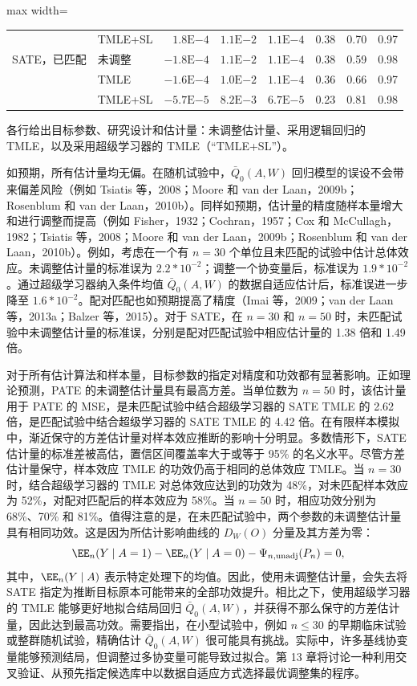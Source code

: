 \begin{table}[htbp]
\begin{adjustbox}{max width=\textwidth}
\begin{tabular}{@{}llrrrrrr@{}}
 & TMLE+SL & $1.8\mathrm E{-4}$ & $1.1\mathrm E{-2}$ & $1.1\mathrm E{-4}$ & 0.38 & 0.70 & 0.97 \\
SATE，已匹配 & 未调整 & $-1.8\mathrm E{-4}$ & $1.1\mathrm E{-2}$ & $1.1\mathrm E{-4}$ & 0.38 & 0.59 & 0.98 \\
 & TMLE & $-1.6\mathrm E{-4}$ & $1.0\mathrm E{-2}$ & $1.1\mathrm E{-4}$ & 0.36 & 0.66 & 0.97 \\
 & TMLE+SL & $-5.7\mathrm E{-5}$ & $8.2\mathrm E{-3}$ & $6.7\mathrm E{-5}$ & 0.23 & 0.81 & 0.98 \\
\bottomrule
\end{tabular}
\end{adjustbox}
\par\smallskip
\begin{minipage}{\textwidth}
各行给出目标参数、研究设计和估计量：未调整估计量、采用逻辑回归的 TMLE，以及采用超级学习器的 TMLE（“TMLE+SL”）。
\end{minipage}
\endgroup
\end{table}

如预期，所有估计量均无偏。在随机试验中，$\bar Q_0(A,W)$ 回归模型的误设不会带来偏差风险（例如 Tsiatis 等，2008；Moore 和 van der Laan，2009b；Rosenblum 和 van der Laan，2010b）。同样如预期，估计量的精度随样本量增大和进行调整而提高（例如 Fisher，1932；Cochran，1957；Cox 和 McCullagh，1982；Tsiatis 等，2008；Moore 和 van der Laan，2009b；Rosenblum 和 van der Laan，2010b）。例如，考虑在一个有 $n=30$ 个单位且未匹配的试验中估计总体效应。未调整估计量的标准误为 $2.2*10^{-2}$；调整一个协变量后，标准误为 $1.9*10^{-2}$。通过超级学习器纳入条件均值 $\bar Q_0(A,W)$ 的数据自适应估计后，标准误进一步降至 $1.6*10^{-2}$。配对匹配也如预期提高了精度（Imai 等，2009；van der Laan 等，2013a；Balzer 等，2015）。对于 SATE，在 $n=30$ 和 $n=50$ 时，未匹配试验中未调整估计量的标准误，分别是配对匹配试验中相应估计量的 1.38 倍和 1.49 倍。

对于所有估计算法和样本量，目标参数的指定对精度和功效都有显著影响。正如理论预测，PATE 的未调整估计量具有最高方差。当单位数为 $n=50$ 时，该估计量用于 PATE 的 MSE，是未匹配试验中结合超级学习器的 SATE TMLE 的 2.62 倍，是匹配试验中结合超级学习器的 SATE TMLE 的 4.42 倍。在有限样本模拟中，渐近保守的方差估计量对样本效应推断的影响十分明显。多数情形下，SATE 估计量的标准差被高估，置信区间覆盖率大于或等于 95\% 的名义水平。尽管方差估计量保守，样本效应 TMLE 的功效仍高于相同的总体效应 TMLE。当 $n=30$ 时，结合超级学习器的 TMLE 对总体效应达到的功效为 48\%，对未匹配样本效应为 52\%，对配对匹配后的样本效应为 58\%。当 $n=50$ 时，相应功效分别为 68\%、70\% 和 81\%。值得注意的是，在未匹配试验中，两个参数的未调整估计量具有相同功效。这是因为所估计影响曲线的 $D_W(O)$ 分量及其方差为零：
\[
\EE_n(Y\mid A=1)-\EE_n(Y\mid A=0)-\Psi_{n,\mathrm{unadj}}(P_n)=0,
\]
其中，$\EE_n(Y\mid A)$ 表示特定处理下的均值。因此，使用未调整估计量，会失去将 SATE 指定为推断目标原本可能带来的全部功效提升。相比之下，使用超级学习器的 TMLE 能够更好地拟合结局回归 $\bar Q_0(A,W)$，并获得不那么保守的方差估计量，因此达到最高功效。需要指出，在小型试验中，例如 $n\leq30$ 的早期临床试验或整群随机试验，精确估计 $\bar Q_0(A,W)$ 很可能具有挑战。实际中，许多基线协变量能够预测结局，但调整过多协变量可能导致过拟合。第 13 章将讨论一种利用交叉验证、从预先指定候选库中以数据自适应方式选择最优调整集的程序。
\FloatBarrier
